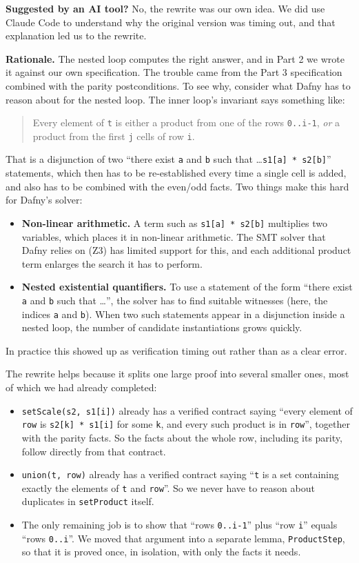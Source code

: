 \documentclass[11pt,a4paper]{article}
\newcommand{\aiflag}[1]{\par\noindent\textbf{Suggested by an AI tool?} #1\par}
\begin{document}
\aiflag{No, the rewrite was our own idea. We did use Claude Code to understand why the original version was timing out, and that explanation led us to the rewrite.}

\textbf{Rationale.} The nested loop computes the right answer, and in Part 2 we wrote it against our own specification. The trouble came from the Part 3 specification combined with the parity postconditions. To see why, consider what Dafny has to reason about for the nested loop. The inner loop's invariant says something like:
\begin{quote}
  Every element of \texttt{t} is either a product from one of the rows \texttt{0..i-1}, \emph{or} a product from the first \texttt{j} cells of row \texttt{i}.
\end{quote}
That is a disjunction of two ``there exist \texttt{a} and \texttt{b} such that \ldots \texttt{s1[a] * s2[b]}'' statements, which then has to be re-established every time a single cell is added, and also has to be combined with the even/odd facts. Two things make this hard for Dafny's solver:
\begin{itemize}
  \item \textbf{Non-linear arithmetic.} A term such as \texttt{s1[a] * s2[b]} multiplies two variables, which places it in non-linear arithmetic. The SMT solver that Dafny relies on (Z3) has limited support for this, and each additional product term enlarges the search it has to perform.
  \item \textbf{Nested existential quantifiers.} To use a statement of the form ``there exist \texttt{a} and \texttt{b} such that \ldots'', the solver has to find suitable witnesses (here, the indices \texttt{a} and \texttt{b}). When two such statements appear in a disjunction inside a nested loop, the number of candidate instantiations grows quickly.
\end{itemize}
In practice this showed up as verification timing out rather than as a clear error.

The rewrite helps because it splits one large proof into several smaller ones, most of which we had already completed:
\begin{itemize}
  \item \texttt{setScale(s2, s1[i])} already has a verified contract saying ``every element of \texttt{row} is \texttt{s2[k] * s1[i]} for some \texttt{k}, and every such product is in \texttt{row}'', together with the parity facts. So the facts about the whole row, including its parity, follow directly from that contract.
  \item \texttt{union(t, row)} already has a verified contract saying ``\texttt{t\textquotesingle} is a set containing exactly the elements of \texttt{t} and \texttt{row}''. So we never have to reason about duplicates in \texttt{setProduct} itself.
  \item The only remaining job is to show that ``rows \texttt{0..i-1}'' plus ``row \texttt{i}'' equals ``rows \texttt{0..i}''. We moved that argument into a separate lemma, \texttt{ProductStep}, so that it is proved once, in isolation, with only the facts it needs.
\end{itemize}
\end{document}
